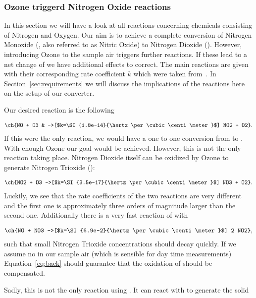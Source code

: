 \subsubsection{Ozone triggerd Nitrogen Oxide reactions}
\label{sec:o-no}

In this section we will have a look at all reactions concerning
chemicals consisting of Nitrogen and Oxygen. Our aim is to achieve a
complete conversion of Nitrogen Monoxide (, also referred to as
Nitric Oxide) to Nitrogen Dioxide (). However, introducing
Ozone to the sample air triggers further reactions. If these lead to a
net change of  we have additional effects to correct. The main
reactions are given with their corresponding rate coefficient $k$
which were taken from~\cite{bsc}. In Section~\ref{sec:requirements} we
will discuss the implications of the reactions here on the setup of
our converter.

Our desired reaction is the following

\begin{align}
  \ch{NO + O3 & ->[$k=\SI{1.8e-14}{\hertz\per\cubic\centi\meter}$] NO2
                + O2}. \label{eq:no}
\end{align}
If this were the only reaction, we would have a one to one conversion
from  to . With enough Ozone our goal would be
achieved. However, this is not the only reaction taking
place. Nitrogen Dioxide itself can be oxidized by Ozone to generate
Nitrogen Trioxide ():

\begin{align}
  \ch{NO2 + O3 ->[$k=\SI{3.5e-17}{\hertz\per\cubic\centi\meter}$] NO3
  + O2}. \label{eq:no2}
\end{align}
Luckily, we see that the rate coefficients of the two reactions are
very different and the first one is approximately three orders of
magnitude larger than the second one. Additionally there is a very
fast reaction of  with 

\begin{align}
  \ch{NO + NO3 ->[$k=\SI{6.9e-2}{\hertz\per\cubic\centi\meter}$] 2 NO2},\label{eq:back}
\end{align}
such that small Nitrogen Trioxide concentrations should decay
quickly. If we assume no  in our sample air (which is sensible
for day time measurements) Equation~\eqref{eq:back} should guarantee
that the oxidation of  should be compensated. 

Sadly, this is not the only reaction using . It can react
with  to generate the solid 


